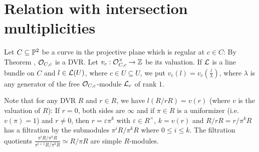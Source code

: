 \documentclass[a4paper,parskip=half,numbers=enddot, DIV=12]{scrreprt}
\begin{document}
\section{Relation with intersection multiplicities}Let $C\subseteq \mathbb{P}^2$ be a curve in the projective plane which is regular at $c\in C$:
By Theorem , $\mathcal{O}_{C,c}$ is a DVR. Let $v_c : \mathcal{O}_{C,c}^\times \rightarrow\mathbb Z$ be its valuation.
If $\mathcal{L}$ is a line bundle on $C$ and $l\in \mathcal{L}(U)$, where
$c\in U\subseteq U$, we put $v_c(l) = v_c\left(\frac l\lambda\right)$, where $\lambda$
is any generator of the free $\mathcal{O}_{C,c}$-module $\mathcal{L}_c$ of rank $1$.

Note that for any DVR $R$ and $r\in R$, we have $l(R/rR) = v(r)$ (where $v$ is the valuation of $R$): If
$r=0$, both sides are $\infty$ and if $\pi\in R$ is a uniformizer (i.e. $v(\pi)=1$) and $r\neq 0$,
then $r=\varepsilon\pi^k$ with $\varepsilon \in R^\times$, $k=v(r)$ and $R/rR = r/\pi^kR$ has
a filtration by the submodules $\pi^iR/\pi^kR$ where $0\leq i\leq k$.
The filtration quotients $\frac{\pi^i R/\pi^k R}{\pi^{i+1} R/\pi^k R} \simeq R/\pi R$ are simple $R$-modules.
\end{document}
